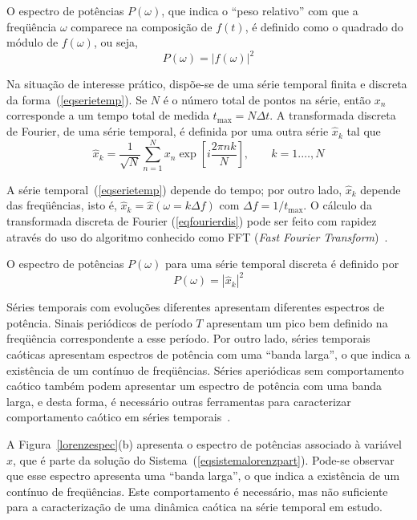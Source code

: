 O espectro de potências $P(\omega)$, que indica o ``peso relativo'' com que a freqüência $\omega$ comparece na composição de $f(t)$, é definido como o quadrado do módulo de $f(\omega)$, ou seja,
\begin{equation}
P(\omega)=\left|f(\omega)\right|^2
\label{eqespectrocont}
\end{equation} 

Na situação de interesse prático, dispõe-se de uma série temporal finita e discreta da forma~(\ref{eqserietemp}). Se $N$ é o número total de pontos na série, então ${x_{n}}$ corresponde a um tempo total de medida $t_\textrm{max}=N\Delta t$. A transformada discreta de Fourier, de uma série temporal, é definida por uma outra série $\widehat{x}_{k}$ tal que
\begin{equation}
\widehat{x}_{k}=\frac{1}{\sqrt{N}}\sum_{n=1}^{N}x_{n}\exp\left[i\frac{2\pi nk}{N}\right],\;\;\;\;\;\;\;k=1.\ldots,N
\label{eqfourierdis}
\end{equation} 

A série temporal~(\ref{eqserietemp}) depende do tempo; por outro lado, $\widehat{x}_{k}$ depende das freqüências, isto é, $\widehat{x}_{k}=\widehat{x}(\omega=k\Delta f)$ com $\Delta f= 1/t_{\textrm{max}}$. O cálculo da transformada discreta de Fourier (\ref{eqfourierdis}) pode ser feito com rapidez através do uso do algoritmo conhecido como FFT (\textit{Fast Fourier Transform})~\cite{cooleytukey/65}.

O espectro de potências $P(\omega)$ para uma série temporal discreta é definido por
\begin{equation}
P(\omega)=\left|\widehat{x}_{k}\right|^2
\label{eqespectrodiscr}
\end{equation} 

Séries temporais com evoluções diferentes apresentam diferentes espectros de potência. Sinais periódicos de período $T$ apresentam um pico bem definido na freqüência correspondente a esse período. Por outro lado, séries temporais caóticas apresentam espectros de potência com uma ``banda larga'', o que indica a existência de um contínuo de freqüências. Séries aperiódicas sem comportamento caótico também podem apresentar um espectro de potência com uma banda larga, e desta forma, é necessário outras ferramentas para caracterizar comportamento caótico em séries temporais~\cite{tufillaro/92}. 

A Figura~\ref{lorenzespec}(b) apresenta o espectro de potências associado à variável $x$, que é parte da solução do Sistema~(\ref{eqsistemalorenzpart}). Pode-se observar que esse espectro apresenta uma ``banda larga'', o que indica a existência de um contínuo de freqüências. Este comportamento é necessário, mas não suficiente para a caracterização de uma dinâmica caótica na série temporal em estudo.

